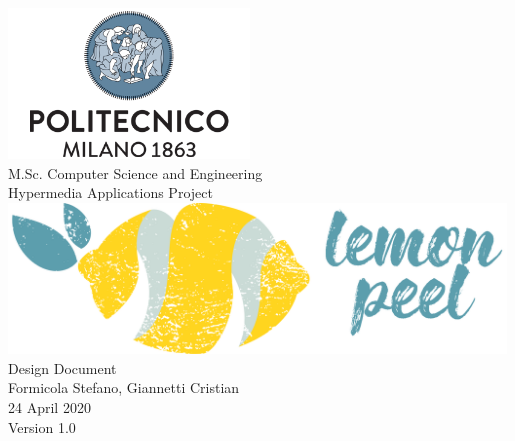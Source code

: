 \documentclass{report}
\begin{document}
	\begin{titlepage}
		\centering
		\vfill
		{
			\includegraphics[width =\linewidth, height = 4cm, keepaspectratio]{PolitecnicoLogo.png}
			\label{fig:PolitecnicoLogo}
			\large \\[2ex]M.Sc. Computer Science and Engineering\\
			\large Hypermedia Applications Project\\[17ex]
			\includegraphics[width =\linewidth, height = 4cm, keepaspectratio]{LemonPeelLogo.png}\\[17ex]

			\huge Design Document\\[4ex]

			\normalsize Formicola Stefano, Giannetti Cristian\\[1.5ex]
			\normalsize 24 April 2020\\[1.5ex]
			\normalsize Version 1.0
		}

	\end{titlepage}

	\newpage

	
	\addtocounter{page}{1}

	\tableofcontents
	\thispagestyle{fancy}
	
	\newpage
	
	
	
	
	
	
	\thispagestyle{fancy}
	
\end{document}
